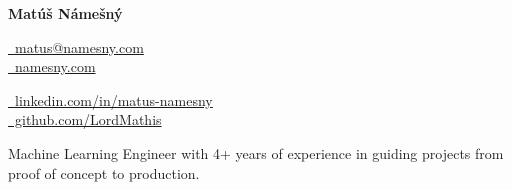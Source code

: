 \documentclass[a4paper,12pt]{article}
\begin{document}
\begin{center}
{\Huge\bfseries\filcenter Matúš Námešný}
\end{center}

\begin{center}
\begin{minipage}{0.45\textwidth}
  \begin{flushleft}
    \href{mailto:matus@namesny.com}{\faEnvelope\ matus@namesny.com} \\[4pt]
    \href{https://namesny.com}{\faGlobe\ namesny.com}
  \end{flushleft}
\end{minipage}
\hfill
\begin{minipage}{0.45\textwidth}
  \begin{flushleft}
    \href{https://www.linkedin.com/in/matus-namesny/}{\faLinkedin\ linkedin.com/in/matus-namesny} \\[4pt]
    \href{https://www.github.com/LordMathis}{\faGithub\ github.com/LordMathis}
  \end{flushleft}
\end{minipage}
\end{center}

 \noindent Machine Learning Engineer with 4+ years of experience in guiding projects from proof of concept to production.
\end{document}
